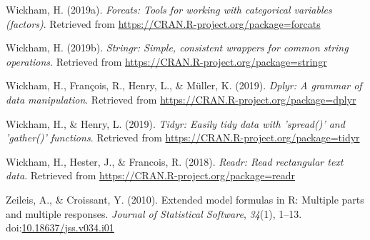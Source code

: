 \documentclass[
  man]{apa6}
\begin{document}
\leavevmode\hypertarget{ref-R-forcats}{}%
Wickham, H. (2019a). \emph{Forcats: Tools for working with categorical variables (factors)}. Retrieved from \url{https://CRAN.R-project.org/package=forcats}

\leavevmode\hypertarget{ref-R-stringr}{}%
Wickham, H. (2019b). \emph{Stringr: Simple, consistent wrappers for common string operations}. Retrieved from \url{https://CRAN.R-project.org/package=stringr}

\leavevmode\hypertarget{ref-R-dplyr}{}%
Wickham, H., François, R., Henry, L., \& Müller, K. (2019). \emph{Dplyr: A grammar of data manipulation}. Retrieved from \url{https://CRAN.R-project.org/package=dplyr}

\leavevmode\hypertarget{ref-R-tidyr}{}%
Wickham, H., \& Henry, L. (2019). \emph{Tidyr: Easily tidy data with 'spread()' and 'gather()' functions}. Retrieved from \url{https://CRAN.R-project.org/package=tidyr}

\leavevmode\hypertarget{ref-R-readr}{}%
Wickham, H., Hester, J., \& Francois, R. (2018). \emph{Readr: Read rectangular text data}. Retrieved from \url{https://CRAN.R-project.org/package=readr}

\leavevmode\hypertarget{ref-R-Formula}{}%
Zeileis, A., \& Croissant, Y. (2010). Extended model formulas in R: Multiple parts and multiple responses. \emph{Journal of Statistical Software}, \emph{34}(1), 1--13. doi:\href{https://doi.org/10.18637/jss.v034.i01}{10.18637/jss.v034.i01}

\endgroup
\end{document}
